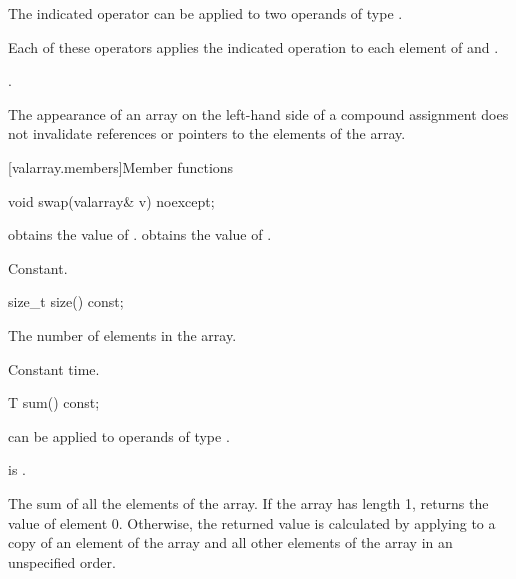 \begin{itemdescr}
\pnum
\mandates
The indicated operator can be applied to two operands of type .

\pnum
\effects
Each of these operators applies the indicated operation to each element
of  and .

\pnum
\returns
{}.

\pnum
\remarks
The appearance of an array on the left-hand side of a compound assignment
does not
invalidate references or pointers to the elements of the array.
\end{itemdescr}

[valarray.members]{Member functions}

%
\begin{itemdecl}
void swap(valarray& v) noexcept;
\end{itemdecl}

\begin{itemdescr}
\pnum
\effects
{} obtains the value of
.  obtains the value of .

\pnum
\complexity
Constant.
\end{itemdescr}

%
\begin{itemdecl}
size_t size() const;
\end{itemdecl}

\begin{itemdescr}
\pnum
\returns
The number of elements in the array.

\pnum
\complexity
Constant time.
\end{itemdescr}

%
\begin{itemdecl}
T sum() const;
\end{itemdecl}

\begin{itemdescr}
\pnum
\mandates
{} can be applied to operands of type .

\pnum
\expects
{} is .

\pnum
\returns
The sum of all the elements of the array.
If the array has length 1, returns the value of element 0.
Otherwise, the returned value is calculated by applying
to a copy of an element of the array and
all other elements of the array in an unspecified order.%
\end{itemdescr}


